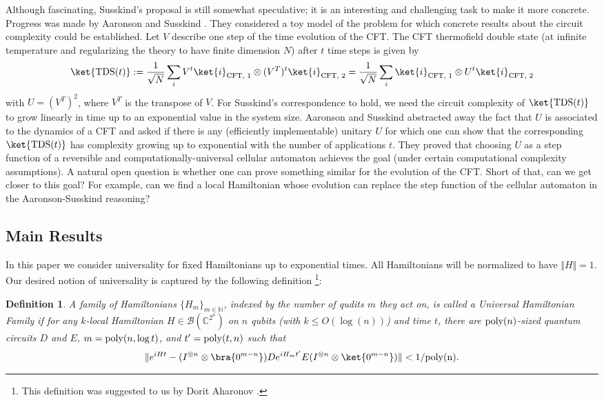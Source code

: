 \documentclass[11pt,letterpaper]{article}
\newtheorem{definition}[theorem]{Definition}
\newcommand{\<}{\langle}
\renewcommand{\>}{\rangle}
\begin{document}
Although fascinating, Susskind's proposal is still somewhat speculative; it is an interesting and challenging task to make it more concrete. Progress was made by Aaronson and Susskind \cite{SA}. They considered a toy model of the problem for which concrete results about the circuit complexity could be established. Let $V$ describe one step of the time evolution of the CFT. The CFT thermofield double state (at infinite temperature and regularizing the theory to have finite dimension $N$) after $t$ time steps is given by
\begin{equation}
\ket{\text{TDS}(t)} := \frac{1}{\sqrt{N}} \sum_i V^t \ket{i}_{\text{CFT, 1}} \otimes (V^T)^t \ket{i}_{\text{CFT, 2}} = \frac{1}{\sqrt{N}} \sum_i \ket{i}_{\text{CFT, 1}} \otimes U^t \ket{i}_{\text{CFT, 2}}
\end{equation} 
with $U = (V^T)^2$, where $V^T$ is the transpose of $V$. For Susskind's correspondence to hold, we need the circuit complexity of $\ket{\text{TDS}(t)}$ to grow linearly in time up to an exponential value in the system size. Aaronson and Susskind abstracted away the fact that $U$ is associated to the dynamics of a CFT  and asked if there is any (efficiently implementable) unitary $U$ for which one can show that the corresponding $\ket{\text{TDS}(t)}$ has complexity growing up to exponential with the number of applications $t$. They proved that choosing $U$ as a step function of a reversible and computationally-universal cellular automaton achieves the goal (under certain computational complexity assumptions). A natural open question is whether one can prove something similar for the evolution of the CFT. Short of that, can we get closer to this goal? For example, can we find a local Hamiltonian whose evolution can replace the step function of the cellular automaton in the Aaronson-Susskind reasoning? 



\subsection{Main Results}


In this paper we consider universality for fixed Hamiltonians up to exponential times. All Hamiltonians will be normalized to have $\Vert H \Vert = 1$. Our desired notion of universality is captured by the following definition \footnote{This definition was suggested to us by Dorit Aharonov \cite{dorit}.}:

\begin{definition} \label{universal}
	A family of Hamiltonians $\{ H_m \}_{m \in \mathbb{N}}$, indexed by the number of qudits $m$ they act on, is called a \emph{Universal Hamiltonian Family} if for any $k$-local Hamiltonian $H\in\mathcal{B}(\mathbb{C}^{2^n})$ on $n$ qubits (with $k \leq O(\log(n))$) and time $t$, there are ${\rm{poly}}(n)$-sized quantum circuits $D$ and $E$, $m={\rm{poly}}(n,\log{t})$, and $t'={\rm{poly}}(t, n)$ such that
	\begin{eqnarray}
		\|e^{iHt}-  (I^{\otimes n} \otimes \bra{0^{m-n}})De^{iH_mt'}E(I^{\otimes n} \otimes \ket{0^{m-n}})  \|< 1/\rm{poly}(n). 
	\end{eqnarray}
\end{definition}
\end{document}
